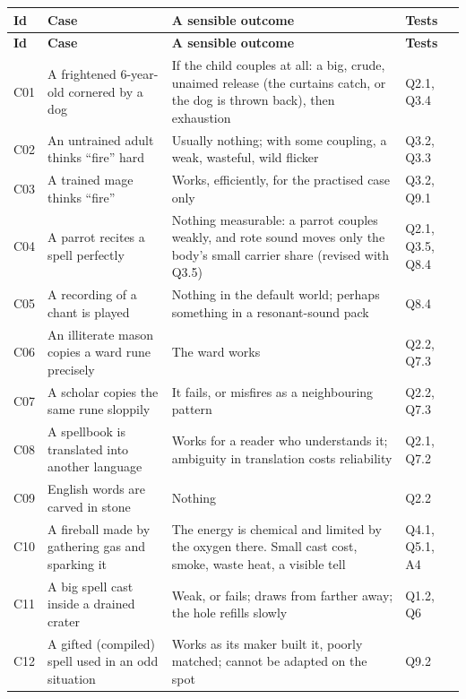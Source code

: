 \begin{longtable}{@{}>{\raggedright\arraybackslash}p{}>{\raggedright\arraybackslash}p{}>{\raggedright\arraybackslash}p{}>{\raggedright\arraybackslash}p{}@{}}
\toprule \textbf{Id} & \textbf{Case} & \textbf{A sensible outcome} & \textbf{Tests}\\ \midrule \endfirsthead
\toprule \textbf{Id} & \textbf{Case} & \textbf{A sensible outcome} & \textbf{Tests}\\ \midrule \endhead
\bottomrule \endfoot
C01 & A frightened 6-year-old cornered by a dog & If the child couples at all: a big, crude, unaimed release (the curtains catch, or the dog is thrown back), then exhaustion & Q2.1, Q3.4\\
C02 & An untrained adult thinks ``fire'' hard & Usually nothing; with some coupling, a weak, wasteful, wild flicker & Q3.2, Q3.3\\
C03 & A trained mage thinks ``fire'' & Works, efficiently, for the practised case only & Q3.2, Q9.1\\
C04 & A parrot recites a spell perfectly & Nothing measurable: a parrot couples weakly, and rote sound moves only the body's small carrier share (revised with Q3.5) & Q2.1, Q3.5, Q8.4\\
C05 & A recording of a chant is played & Nothing in the default world; perhaps something in a resonant-sound pack & Q8.4\\
C06 & An illiterate mason copies a ward rune precisely & The ward works & Q2.2, Q7.3\\
C07 & A scholar copies the same rune sloppily & It fails, or misfires as a neighbouring pattern & Q2.2, Q7.3\\
C08 & A spellbook is translated into another language & Works for a reader who understands it; ambiguity in translation costs reliability & Q2.1, Q7.2\\
C09 & English words are carved in stone & Nothing & Q2.2\\
C10 & A fireball made by gathering gas and sparking it & The energy is chemical and limited by the oxygen there. Small cast cost, smoke, waste heat, a visible tell & Q4.1, Q5.1, A4\\
C11 & A big spell cast inside a drained crater & Weak, or fails; draws from farther away; the hole refills slowly & Q1.2, Q6\\
C12 & A gifted (compiled) spell used in an odd situation & Works as its maker built it, poorly matched; cannot be adapted on the spot & Q9.2\\

\end{longtable}
